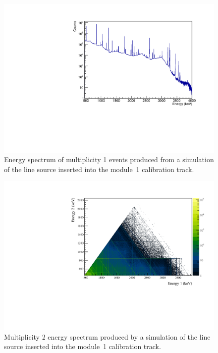 \documentclass[/main.tex]{subfiles}
\begin{document}
\begin{figure}
  \centering
  \includegraphics[width=.8\linewidth]{Co56Sim1D}
  \caption[Simulation of multiplicty 1 events from  line source]{ \label{fig:56Co1D}
    Energy spectrum of multiplicity 1 events produced from a simulation of the  line source inserted into the module~1 calibration track.
  }
\end{figure}

\begin{figure}
  \centering
  \includegraphics[width=.8\linewidth]{Co56Sim2D}
  \caption[Simulation of multiplicty 2 events from  line source]{ \label{fig:Co56Sim2D}
    Multiplicity 2 energy spectrum produced by a simulation of the  line source inserted into the module~1 calibration track.
  }
\end{figure}


\onlyinsubfile{
  
  
}
\end{document}
